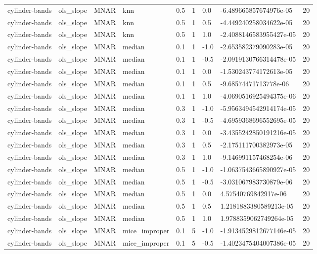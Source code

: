 \begin{tabular}{lllllllll}
cylinder-bands & ols\_slope & MNAR & knn & 0.5 & 1 & 0.0 & -6.489665857674976e-05 & 20 \\
cylinder-bands & ols\_slope & MNAR & knn & 0.5 & 1 & 0.5 & -4.449240258034622e-05 & 20 \\
cylinder-bands & ols\_slope & MNAR & knn & 0.5 & 1 & 1.0 & -2.4088146583955427e-05 & 20 \\
cylinder-bands & ols\_slope & MNAR & median & 0.1 & 1 & -1.0 & -2.653582379090283e-05 & 20 \\
cylinder-bands & ols\_slope & MNAR & median & 0.1 & 1 & -0.5 & -2.0919130766314478e-05 & 20 \\
cylinder-bands & ols\_slope & MNAR & median & 0.1 & 1 & 0.0 & -1.530243774172613e-05 & 20 \\
cylinder-bands & ols\_slope & MNAR & median & 0.1 & 1 & 0.5 & -9.68574471713778e-06 & 20 \\
cylinder-bands & ols\_slope & MNAR & median & 0.1 & 1 & 1.0 & -4.0690516925494375e-06 & 20 \\
cylinder-bands & ols\_slope & MNAR & median & 0.3 & 1 & -1.0 & -5.9563494542914174e-05 & 20 \\
cylinder-bands & ols\_slope & MNAR & median & 0.3 & 1 & -0.5 & -4.6959368696552695e-05 & 20 \\
cylinder-bands & ols\_slope & MNAR & median & 0.3 & 1 & 0.0 & -3.4355242850191216e-05 & 20 \\
cylinder-bands & ols\_slope & MNAR & median & 0.3 & 1 & 0.5 & -2.175111700382973e-05 & 20 \\
cylinder-bands & ols\_slope & MNAR & median & 0.3 & 1 & 1.0 & -9.146991157468254e-06 & 20 \\
cylinder-bands & ols\_slope & MNAR & median & 0.5 & 1 & -1.0 & -1.0637543665890927e-05 & 20 \\
cylinder-bands & ols\_slope & MNAR & median & 0.5 & 1 & -0.5 & -3.031067983730879e-06 & 20 \\
cylinder-bands & ols\_slope & MNAR & median & 0.5 & 1 & 0.0 & 4.57540769842917e-06 & 20 \\
cylinder-bands & ols\_slope & MNAR & median & 0.5 & 1 & 0.5 & 1.2181883380589213e-05 & 20 \\
cylinder-bands & ols\_slope & MNAR & median & 0.5 & 1 & 1.0 & 1.9788359062749264e-05 & 20 \\
cylinder-bands & ols\_slope & MNAR & mice\_improper & 0.1 & 5 & -1.0 & -1.9134529812677146e-05 & 20 \\
cylinder-bands & ols\_slope & MNAR & mice\_improper & 0.1 & 5 & -0.5 & -1.4023475404007386e-05 & 20 \\

\end{tabular}

